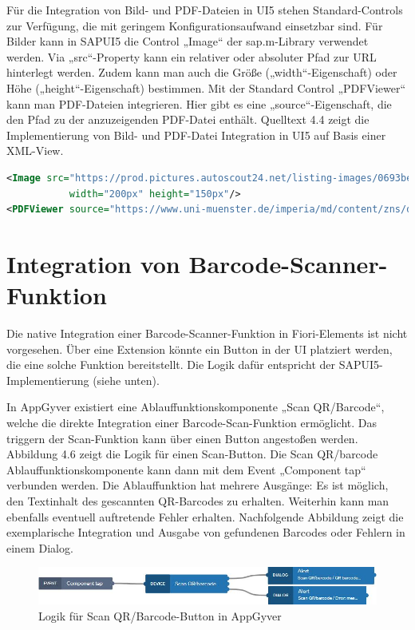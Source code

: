 Für die Integration von Bild- und PDF-Dateien in UI5 stehen Standard-Controls zur Verfügung, die mit geringem Konfigurationsaufwand einsetzbar sind. Für Bilder kann in SAPUI5 die Control „Image“ der sap.m-Library verwendet werden. Via „src“-Property kann ein relativer oder absoluter Pfad zur URL hinterlegt werden. Zudem kann man auch die Größe („width“-Eigenschaft) oder Höhe („height“-Eigenschaft) bestimmen. Mit der Standard Control „PDFViewer“ kann man PDF-Dateien integrieren. Hier gibt es eine „source“-Eigenschaft, die den Pfad zu der anzuzeigenden PDF-Datei enthält. Quelltext 4.4 zeigt die Implementierung von Bild- und PDF-Datei Integration in UI5 auf Basis einer XML-View.
\begin{lstlisting}[language=XML,  caption=Implementierung Bild- und PDF Datei Integration in SAPUI5]
<Image src="https://prod.pictures.autoscout24.net/listing-images/0693be87-aaad-4dc8-99c5-a69b3bd48b81_1934e390-16f2-4e47-b248-02e9cc9b746b.jpg"
           width="200px" height="150px"/>
<PDFViewer source="https://www.uni-muenster.de/imperia/md/content/zns/dokumente/beispielexpos___kowi_empirisch.pdf"/>
\end{lstlisting}

\section{Integration von Barcode-Scanner-Funktion}

Die native Integration einer Barcode-Scanner-Funktion in Fiori-Elements ist nicht vorgesehen. Über eine Extension könnte ein Button in der UI platziert werden, die eine solche Funktion bereitstellt. Die Logik dafür entspricht der SAPUI5-Implementierung (siehe unten).

In AppGyver existiert eine Ablauffunktionskomponente „Scan QR/Barcode“, welche die direkte Integration einer Barcode-Scan-Funktion ermöglicht. Das triggern der Scan-Funktion kann über einen Button angestoßen werden. Abbildung 4.6 zeigt die Logik für einen Scan-Button. Die Scan QR/barcode Ablauffunktionskomponente kann dann mit dem Event „Component tap“ verbunden werden. Die Ablauffunktion hat mehrere Ausgänge: Es ist möglich, den Textinhalt des gescannten QR-Barcodes zu erhalten. Weiterhin kann man ebenfalls eventuell auftretende Fehler erhalten. Nachfolgende Abbildung zeigt die exemplarische Integration und Ausgabe von gefundenen Barcodes oder Fehlern in einem Dialog.

\begin{figure}[htbp]
 \centering
 \includegraphics[width=1.0\textwidth]{Bilder/appgyver/4_8_logik_scan_barcode.jpg}
 \caption{Logik für Scan QR/Barcode-Button in AppGyver}
\end{figure}

